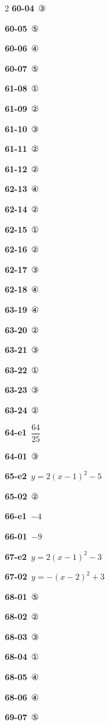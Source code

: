 \documentclass[10pt,a4paper]{article}
\begin{document}
\begin{multicols}{2}
\noindent\textbf{60-04}\ ③\par
\noindent\textbf{60-05}\ ⑤\par
\noindent\textbf{60-06}\ ④\par
\noindent\textbf{60-07}\ ⑤\par
\noindent\textbf{61-08}\ ①\par
\noindent\textbf{61-09}\ ②\par
\noindent\textbf{61-10}\ ③\par
\noindent\textbf{61-11}\ ②\par
\noindent\textbf{61-12}\ ②\par
\noindent\textbf{62-13}\ ④\par
\noindent\textbf{62-14}\ ②\par
\noindent\textbf{62-15}\ ①\par
\noindent\textbf{62-16}\ ②\par
\noindent\textbf{62-17}\ ③\par
\noindent\textbf{62-18}\ ④\par
\noindent\textbf{63-19}\ ④\par
\noindent\textbf{63-20}\ ②\par
\noindent\textbf{63-21}\ ③\par
\noindent\textbf{63-22}\ ①\par
\noindent\textbf{63-23}\ ③\par
\noindent\textbf{63-24}\ ②\par
\noindent\textbf{64-e1}\ $\dfrac{64}{25}$\par
\noindent\textbf{64-01}\ ③\par
\noindent\textbf{65-e2}\ $y=2(x-1)^2-5$\par
\noindent\textbf{65-02}\ ②\par
\noindent\textbf{66-e1}\ $-4$\par
\noindent\textbf{66-01}\ $-9$\par
\noindent\textbf{67-e2}\ $y=2(x-1)^2-3$\par
\noindent\textbf{67-02}\ $y=-(x-2)^2+3$\par
\noindent\textbf{68-01}\ ⑤\par
\noindent\textbf{68-02}\ ②\par
\noindent\textbf{68-03}\ ③\par
\noindent\textbf{68-04}\ ①\par
\noindent\textbf{68-05}\ ④\par
\noindent\textbf{68-06}\ ④\par
\noindent\textbf{69-07}\ ⑤\par

\end{multicols}
\end{document}
